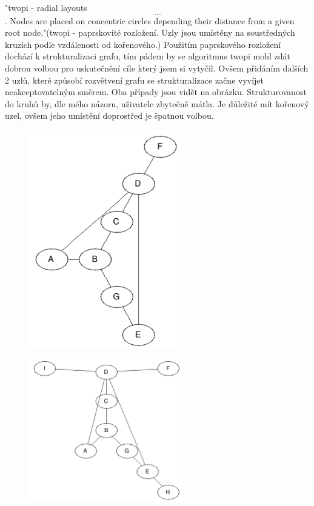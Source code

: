 \documentclass[color,table,oneside,nolot,nolof]{fithesis}
\begin{document}
	"twopi - radial layouts\[...\].  Nodes are placed on concentric circles depending their distance from a given root node."\cite{graphviz_layout}(twopi - paprskovité rozložení. Uzly
	jsou umístěny na soustředných kruzích podle vzdálenosti od kořenového.) Použitím paprskového rozložení dochází k strukturalizaci grafu, tím pádem by se algoritmus twopi mohl zdát 
	dobrou volbou pro uskutečnění cíle který jsem si vytyčil. Ovšem přidáním dalších 2 uzlů, které způsobí rozvětvení grafu se strukturalizace začne vyvíjet neakceptovatelným směrem.
	Oba případy jsou vidět na obrázku. Strukturovanost do kruhů by, dle mého názoru, uživatele zbytečně mátla. Je důležité mít kořenový uzel, ovšem jeho umístění doprostřed je špatnou
	volbou.
\begin{figure}
	\centering
	\includegraphics[width=0.6\textwidth]{pictures/twopi_example.png} 
\end{figure}
\begin{figure}
	\centering
	\includegraphics[width=0.6\textwidth]{pictures/twopi_example_2.png} 
\end{figure}
\end{document}
